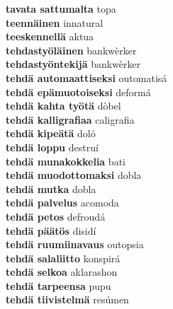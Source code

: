 \textbf{ tavata sattumalta  } topa \\
\textbf{ teennäinen  } innatural \\
\textbf{ teeskennellä  } aktua \\
\textbf{ tehdastyöläinen  } bankwèrker \\
\textbf{ tehdastyöntekijä  } bankwèrker \\
\textbf{ tehdä automaattiseksi  } outomatisá \\
\textbf{ tehdä epämuotoiseksi  } deformá \\
\textbf{ tehdä kahta työtä  } dòbel \\
\textbf{ tehdä kalligrafiaa  } caligrafia \\
\textbf{ tehdä kipeätä  } doló \\
\textbf{ tehdä loppu  } destruí \\
\textbf{ tehdä munakokkelia  } bati \\
\textbf{ tehdä muodottomaksi  } dobla \\
\textbf{ tehdä mutka  } dobla \\
\textbf{ tehdä palvelus  } acomoda \\
\textbf{ tehdä petos  } defroudá \\
\textbf{ tehdä päätös  } disidí \\
\textbf{ tehdä ruumiinavaus  } outopsia \\
\textbf{ tehdä salaliitto  } konspirá \\
\textbf{ tehdä selkoa  } aklarashon \\
\textbf{ tehdä tarpeensa  } pupu \\
\textbf{ tehdä tiivistelmä  } resúmen \\
